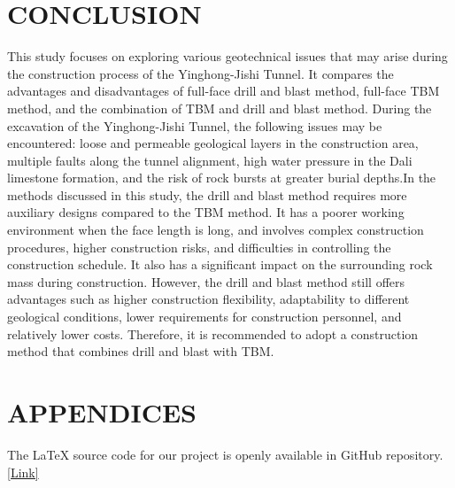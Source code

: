 \documentclass[11pt]{article}
\newcommand{\sectiontitle}[1]{\noindent\textbf{\MakeUppercase{#1}}}
\newcommand{\firstletter}[1]{\textbf{\fontsize{14}{17}\selectfont #1}}
\begin{document}
\section*{\sectiontitle{\firstletter{4} \hspace{0.1cm} \firstletter{C}onclusion}}

This study focuses on exploring various geotechnical issues that may arise during the construction process of the Yinghong-Jishi Tunnel. It compares the advantages and disadvantages of full-face drill and blast method, full-face TBM method, and the combination of TBM and drill and blast method. During the excavation of the Yinghong-Jishi Tunnel, the following issues may be encountered: loose and permeable geological layers in the construction area, multiple faults along the tunnel alignment, high water pressure in the Dali limestone formation, and the risk of rock bursts at greater burial depths.In the methods discussed in this study, the drill and blast method requires more auxiliary designs compared to the TBM method. It has a poorer working environment when the face length is long, and involves complex construction procedures, higher construction risks, and difficulties in controlling the construction schedule. It also has a significant impact on the surrounding rock mass during construction. However, the drill and blast method still offers advantages such as higher construction flexibility, adaptability to different geological conditions, lower requirements for construction personnel, and relatively lower costs. Therefore, it is recommended to adopt a construction method that combines drill and blast with TBM.

\section*{\sectiontitle{\firstletter{A}ppendices}}

The LaTeX source code for our project is openly available in GitHub repository.\href{https://github.com/ArtisanMinds/monash_coursework}{[Link]}

\printbibliography
\end{document}
